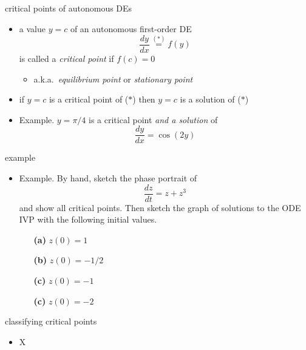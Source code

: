 \documentclass{beamer}
\begin{document}
\begin{frame}{critical points of autonomous DEs}

\begin{itemize}
\item a value $y=c$ of an autonomous first-order DE
    $$\frac{dy}{dx} \stackrel{(\ast)}{=} f(y)$$
is called a \emph{critical point} if $f(c)=0$
    \begin{itemize}
    \item a.k.a.~\emph{equilibrium point} or \emph{stationary point}
    \end{itemize}

\medskip
\item if $y=c$ is a critical point of ($\ast$) then $y=c$ is a solution of ($\ast$)

\medskip
\item Example.  $y=\pi/4$ is a critical point \emph{and a solution} of
    $$\frac{dy}{dx} = \cos(2y)$$

\vspace{5mm}
\end{itemize}
\end{frame}


\begin{frame}{example}

\begin{itemize}
\small
\item \begin{minipage}[t]{0.4\textwidth}
Example.  By hand, sketch the phase portrait of
   $$\frac{dz}{dt} = z + z^3$$
and show all critical points.  Then sketch the graph of solutions to the ODE IVP with the following initial values.
    \begin{itemize}
    \item[\color{black} \textbf{(a)}] $z(0)=1$
    \item[\color{black} \textbf{(b)}] $z(0)=-1/2$
    \item[\color{black} \textbf{(c)}] $z(0)=-1$
    \item[\color{black} \textbf{(c)}] $z(0)=-2$
    \end{itemize}
\end{minipage}
\end{itemize}
\end{frame}


\begin{frame}{classifying critical points}

\begin{itemize}
\item X
\end{itemize}
\end{frame}
\end{document}
